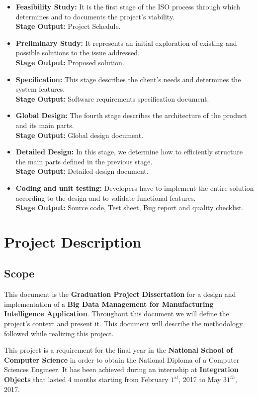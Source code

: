\begin{itemize}
\item \textbf{Feasibility Study:} It is the first stage of the ISO process through which determines and to documents the project’s viability. \\ \textbf{Stage Output:} Project Schedule.
\item \textbf{Preliminary Study:} It represents an initial exploration of existing and possible solutions to the issue addressed. \\ \textbf{Stage Output:} Proposed solution.
\item \textbf{Specification:} This stage describes the client’s needs and determines the system features.\\ \textbf{Stage Output:} Software requirements specification document.
\item \textbf{Global Design:} The fourth stage describes the architecture of the product and its main parts. \\ \textbf{Stage Output:} Global design document.
\item \textbf{Detailed Design:} In this stage, we determine how to efficiently structure the main parts defined in the previous stage. \\\textbf{Stage Output:} Detailed design document.
\item \textbf{Coding and unit testing:} Developers have to implement the entire solution according to the design and to validate functional features. \\\textbf{Stage Output:} Source code, Test sheet, Bug report and quality checklist.
\end{itemize}
\section{Project Description}
\subsection{Scope}

This document is the \textbf{Graduation Project Dissertation} for a design and implementation of a \textbf{Big Data Management for Manufacturing Intelligence Application}. Throughout this document we will define the project's context and present it. This document will describe the methodology followed while realizing this project.


This project is a requirement for the final year in the \textbf{National School of Computer Science} in order to obtain the National Diploma of a Computer Sciences Engineer. It has been achieved during an internship
at \textbf{Integration Objects} that lasted 4 months starting from February $1^{st}$, 2017 to May $31^{th}$, 2017.


